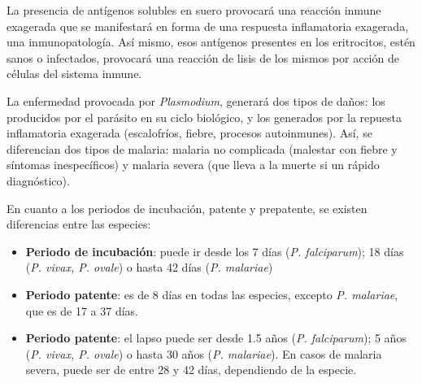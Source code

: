 La presencia de antígenos solubles en suero provocará una reacción inmune exagerada que se manifestará en forma de una respuesta inflamatoria exagerada, una inmunopatología. Así mismo, esos antígenos presentes en los eritrocitos, estén sanos o infectados, provocará una reacción de lisis de los mismos por acción de células del sistema inmune.

La enfermedad provocada por \textit{Plasmodium}, generará dos tipos de daños: los producidos por el parásito en su ciclo biológico, y los generados por la repuesta inflamatoria exagerada (escalofríos, fiebre, procesos autoinmunes). Así, se diferencian dos tipos de malaria: malaria no complicada (malestar con fiebre y síntomas inespecíficos) y malaria severa (que lleva a la muerte si un rápido diagnóstico).

En cuanto a los periodos de incubación, patente y prepatente, se existen diferencias entre las especies:
\begin{itemize}[itemsep=0pt,parsep=0pt,topsep=0pt,partopsep=0pt]
	\item\textbf{Periodo de incubación}: puede ir desde los 7 días (\textit{P. falciparum}); 18 días (\textit{P. vivax, P. ovale}) o hasta 42 días (\textit{P. malariae})
	\item\textbf{Periodo patente}: es de 8 días en todas las especies, excepto \textit{P. malariae}, que es de 17 a 37 días.
	\item\textbf{Periodo patente}: el lapso puede ser desde 1.5 años (\textit{P. falciparum}); 5 años (\textit{P. vivax, P. ovale}) o hasta 30 años (\textit{P. malariae}). En casos de malaria severa, puede ser de entre 28 y 42 días, dependiendo de la especie.
\end{itemize}

